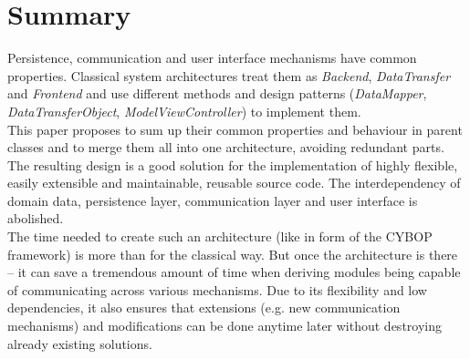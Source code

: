 \section{Summary}
\label{summary_section}

Persistence, communication and user interface mechanisms have common properties.
Classical system architectures treat them as \emph{Backend}, \emph{DataTransfer}
and \emph{Frontend} and use different methods and design patterns (\emph{DataMapper},
\emph{DataTransferObject}, \emph{ModelViewController}) to implement them.\\
This paper proposes to sum up their common properties and behaviour in parent
classes and to merge them all into one architecture, avoiding redundant parts.
The resulting design is a good solution for the implementation of highly flexible,
easily extensible and maintainable, reusable source code. The interdependency of
domain data, persistence layer, communication layer and user interface is abolished.\\
The time needed to create such an architecture (like in form of the CYBOP framework)
is more than for the classical way. But once the architecture is there -- it can
save a tremendous amount of time when deriving modules being capable of communicating
across various mechanisms. Due to its flexibility and low dependencies, it also
ensures that extensions (e.g. new communication mechanisms) and modifications
can be done anytime later without destroying already existing solutions.
